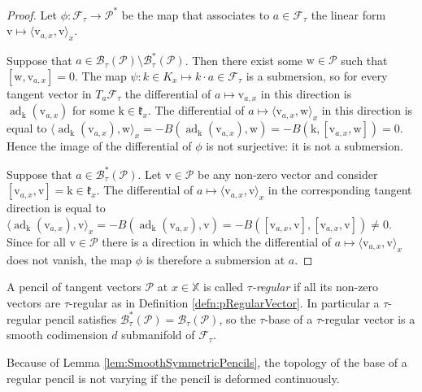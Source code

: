 \documentclass[reqno,10pt]{amsart}
\theoremstyle{plain}
\theoremstyle{definition}
\theoremstyle{remark}
\newcommand{\type}{\tau}
\DeclareMathOperator{\ad}{ad}
\newcommand{\X}{\mathbb{X}}
\begin{document}
\begin{proof}
Let $\phi: \mathcal{F}_\type\to \mathcal{P}^*$ be the map that associates to $a\in \mathcal{F}_\type$ the linear form $\mathrm{v} \mapsto \langle \mathrm{v}_{a,x},\mathrm{v} \rangle_x$.

Suppose that $a\in \mathcal{B}_\type(\mathcal{P})\setminus \mathcal{B}^*_\type(\mathcal{P})$. Then there exist some $\mathrm{w}\in \mathcal{P}$ such that $[\mathrm{w},\mathrm{v}_{a,x}]=0$. The map $\psi:k\in K_x\mapsto k\cdot a\in \mathcal{F}_\type$ is a submersion, so for every tangent vector in $T_a\mathcal{F}_\type$ the differential of $a\mapsto\mathrm{v}_{a,x}$ in this direction is $\ad_\mathrm{k}(\mathrm{v}_{a,x})$ for some $\mathrm{k}\in \mathfrak{k}_x$. The differential of $a\mapsto \langle \mathrm{v}_{a,x},\mathrm{w}\rangle_x$ in this direction is equal to $\langle \ad_\mathrm{k}(\mathrm{v}_{a,x}),\mathrm{w}\rangle_x=-B(\ad_\mathrm{k}(\mathrm{v}_{a,x}),\mathrm{w})=-B(\mathrm{k},[\mathrm{v}_{a,x},\mathrm{w}])=0$. Hence the image of the differential of $\phi$ is not surjective: it is not a submersion.

\medskip

Suppose that $a\in \mathcal{B}^*_\type(\mathcal{P})$. Let $\mathrm{v}\in \mathcal{P}$ be any non-zero vector and consider $[\mathrm{v}_{a,x},\mathrm{v}]=\mathrm{k}\in \mathfrak{k}_x$. The differential of $a\mapsto \langle \mathrm{v}_{a,x},\mathrm{v}\rangle_x$ in the corresponding tangent direction is equal to $\langle \ad_\mathrm{k}(\mathrm{v}_{a,x}),\mathrm{v}\rangle_x=-B(\ad_\mathrm{k}(\mathrm{v}_{a,x}),\mathrm{v})=-B([\mathrm{v}_{a,x},\mathrm{v}],[\mathrm{v}_{a,x},\mathrm{v}])\neq 0$. Since for all $\mathrm{v}\in \mathcal{P}$ there is a direction in which the differential of $a\mapsto \langle \mathrm{v}_{a,x},\mathrm{v}\rangle_x$ does not vanish, the map $\phi$ is therefore a submersion at $a$.
\end{proof}

A pencil of tangent vectors $\mathcal{P}$ at $x\in \X$ is called \emph{$\type$-regular} if all its non-zero vectors are $\type$-regular as in Definition \ref{defn:pRegularVector}. In particular a $\type$-regular pencil satisfies $\mathcal{B}^*_\type(\mathcal{P})=\mathcal{B}_\type(\mathcal{P})$, so the $\type$-base of a $\type$-regular vector is a smooth codimension $d$ submanifold of $\mathcal{F}_\type$.


\medskip

Because of Lemma \ref{lem:SmoothSymmetricPencils}, the topology of the base of a  regular pencil is not varying if the pencil is deformed continuously.
\end{document}
